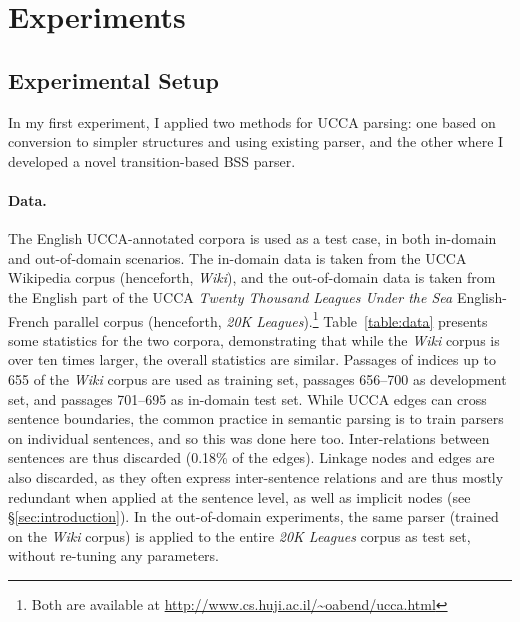 \documentclass[12pt]{article}
\begin{document}
\section{Experiments}\label{sec:experiments}

\subsection{Experimental Setup}\label{sec:setup}

In my first experiment, I applied two methods for UCCA parsing:
one based on conversion to simpler structures and using existing parser,
and the other where I developed a novel transition-based BSS parser.

\paragraph{Data.}\label{sec:data}
The English UCCA-annotated corpora \cite{abend2013universal} is used
as a test case, in both in-domain and out-of-domain scenarios.
The in-domain data is taken from the UCCA Wikipedia corpus (henceforth, \textit{Wiki}),
and the out-of-domain data is taken from the English part of the UCCA
\textit{Twenty Thousand Leagues Under the Sea} English-French parallel corpus
(henceforth, \textit{20K Leagues}).\footnote{Both are available at
\url{http://www.cs.huji.ac.il/~oabend/ucca.html}}
Table~\ref{table:data} presents some statistics for the two corpora, demonstrating that while
the \textit{Wiki} corpus is over ten times larger, the overall statistics are
similar.
Passages of indices up to 655 of the \textit{Wiki} corpus are used as training
set, passages 656--700 as development set, and passages 701--695 as in-domain test set.
While UCCA edges can cross sentence boundaries, the common
practice in semantic parsing is to train parsers on individual sentences,
and so this was done here too.
Inter-relations between sentences are thus discarded (0.18\% of the edges).
Linkage nodes and edges are also discarded, as they often express
inter-sentence relations and are thus mostly redundant when applied at the
sentence level, as well as implicit nodes (see \S\ref{sec:introduction}).
In the out-of-domain experiments, the same parser
(trained on the \textit{Wiki} corpus) is applied to the entire \textit{20K
Leagues} corpus as test set, without re-tuning any parameters.
\end{document}
